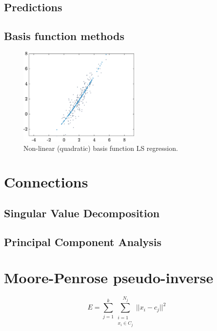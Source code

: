 \documentclass[10pt,twocolumn]{article}
\begin{document}
\subsection{Predictions}

\subsection{Basis function methods}

\begin{figure}[H]
\centering\includegraphics[width=6cm]{LS-nonlinear-basis-functions.eps}
\caption{Non-linear (quadratic) basis function LS regression.}
\label{fig:LS-linear-basis}
\end{figure}








\section{Connections}

\subsection{Singular Value Decomposition}

\subsection{Principal Component Analysis}

\section{Moore-Penrose pseudo-inverse}


\begin{equation}
E = \sum_{j=1}^k \sum\limits_{\substack{i=1 \\ x_i \in C_j}}^{N_j} || x_i - c_j ||^2
\end{equation}
\end{document}
